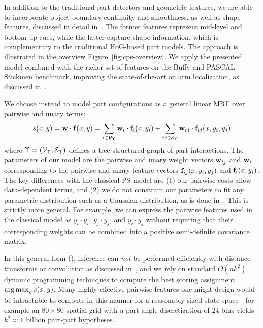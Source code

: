 In addition to the traditional part detectors and geometric features, we are 
able to incorporate object boundary continuity and smoothness, as well as shape 
features, discussed in detail in~. The former features 
represent mid-level and bottom-up cues, while the latter capture shape 
information, which is complementary to the traditional HoG-based part models.  
The approach is illustrated in the overview Figure~\ref{fig:cps-overview}. We 
apply the presented \CPS model combined with the richer set of features on the 
Buffy and PASCAL Stickmen benchmark, improving the state-of-the-art on arm 
localization, as discussed in~. 

\label{subsec:our_ps}
We choose instead to model part configurations as a general linear MRF over 
pairwise and unary terms:
\begin{align}
s(x,y)  = \mathbf{w} \cdot \mathbf{f}(x,y) = \sum_{i \in \mathcal{V}_\Upsilon} \mathbf{w}_i \cdot \mathbf{f}_i(x,y_i)  + 
\sum_{ij \in \mathcal{E}_\Upsilon} \mathbf{w}_{ij} \cdot \mathbf{f}_{ij}(x,y_i,y_j)
\label{eq:cps}
\end{align}
where $\Upsilon = (\mathcal{V}_\Upsilon,\mathcal{E}_\Upsilon)$ defines a tree structured graph of part 
interactions.  The parameters of our model are the pairwise and unary weight 
vectors $\mathbf{w}_{ij}$ and $\mathbf{w}_i$ corresponding to the pairwise and unary feature 
vectors $\mathbf{f}_{ij}(x,y_i,y_j)$ and $\mathbf{f}_i(x,y_i)$.   The key differences with the 
classical PS model are (1) our pairwise costs allow data-dependent terms, and 
(2) we do not constrain our parameters to fit any parametric distribution such 
as a Gaussian distribution, as is done 
in~\citet{felz05,devacrf,andriluka09,eichner09}.  This is strictly more 
general.  For example, we can express the pairwise features used in the 
classical model as $y_{i} \cdot y_{i}$, $y_{j}\cdot y_{j}$, and $y_{i}\cdot 
y_{j}$ without requiring that their corresponding weights can be combined into 
a positive semi-definite covariance matrix.

In this general form (), inference can {\em not} be performed 
efficiently with distance transforms or convolution as discussed 
in~, and we rely on standard $O(nk^2)$ dynamic programming 
techniques to compute the best scoring assignment $\mathop{\arg\max}_y s(x,y)$.  Many 
highly effective pairwise features one might design would be intractable to 
compute in this manner for a reasonably-sized state space---for example an $80 
\times 80$ spatial grid with a part angle discretization of $24$ bins yields 
$k^2 \approx 1$ billion part-part hypotheses.

